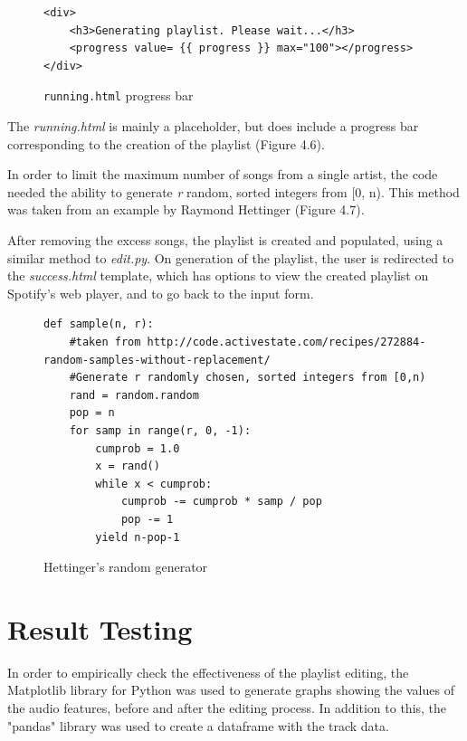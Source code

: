 \begin{figure}[!h]
\begin{lstlisting}
<div>
    <h3>Generating playlist. Please wait...</h3>
    <progress value= {{ progress }} max="100"></progress>
</div>
\end{lstlisting}
\caption{{\tt running.html} progress bar}
\end{figure}

The \textit{running.html} is mainly a placeholder, but does include a progress
bar corresponding to the creation of the playlist (Figure 4.6).

In order to limit the maximum number of songs from a single artist, the code needed
the ability to generate \textit{r} random, sorted integers from [0, n). This method
was taken from an example by Raymond Hettinger \cite{Hettinger:04} (Figure 4.7).

After removing the excess songs, the playlist is created and populated, using
a similar method to \textit{edit.py}. On generation of the playlist, the user
is redirected to the \textit{success.html} template, which has options to view
the created playlist on Spotify's web player, and to go back to the input form.


\begin{figure}[!h]
\begin{lstlisting}
def sample(n, r):
    #taken from http://code.activestate.com/recipes/272884-random-samples-without-replacement/
    #Generate r randomly chosen, sorted integers from [0,n)
    rand = random.random
    pop = n
    for samp in range(r, 0, -1):
        cumprob = 1.0
        x = rand()
        while x < cumprob:
            cumprob -= cumprob * samp / pop
            pop -= 1
        yield n-pop-1
\end{lstlisting}
\caption{Hettinger's random generator}
\end{figure}

\clearpage

\section{Result Testing}

In order to empirically check the effectiveness of the playlist editing, the
Matplotlib library for Python \cite{Matplotlib:19} was used to generate graphs
showing the values of the audio features, before and after the editing process.
In addition to this, the "pandas" library \cite{Pandas:19} was used to create a
dataframe with the track data.


